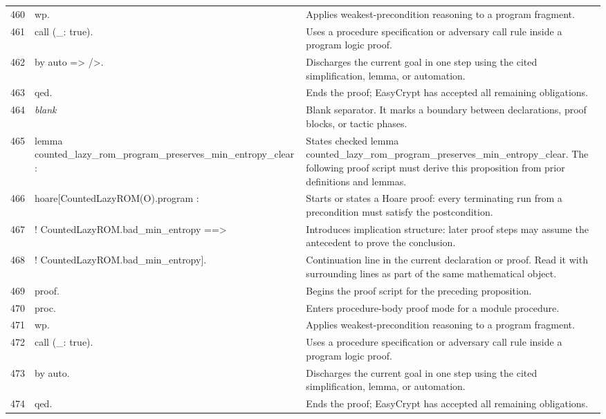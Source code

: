 \documentclass[10pt]{article}
\begin{document}
\begin{longtable}{r L{0.53\textwidth} L{0.37\textwidth}}
460 & {\ttfamily\scriptsize wp.} & Applies weakest-precondition reasoning to a program fragment. \\
461 & {\ttfamily\scriptsize call (\_: true).} & Uses a procedure specification or adversary call rule inside a program logic proof. \\
462 & {\ttfamily\scriptsize by auto => />.} & Discharges the current goal in one step using the cited simplification, lemma, or automation. \\
463 & {\ttfamily\scriptsize qed.} & Ends the proof; EasyCrypt has accepted all remaining obligations. \\
464 & {\ttfamily\scriptsize \emph{blank}} & Blank separator.  It marks a boundary between declarations, proof blocks, or tactic phases. \\
465 & {\ttfamily\scriptsize lemma counted\_lazy\_rom\_program\_preserves\_min\_entropy\_clear :} & States checked lemma counted\_lazy\_rom\_program\_preserves\_min\_entropy\_clear.  The following proof script must derive this proposition from prior definitions and lemmas. \\
466 & {\ttfamily\scriptsize   hoare[CountedLazyROM(O).program :} & Starts or states a Hoare proof: every terminating run from a precondition must satisfy the postcondition. \\
467 & {\ttfamily\scriptsize     ! CountedLazyROM.bad\_min\_entropy ==>} & Introduces implication structure: later proof steps may assume the antecedent to prove the conclusion. \\
468 & {\ttfamily\scriptsize     ! CountedLazyROM.bad\_min\_entropy].} & Continuation line in the current declaration or proof.  Read it with surrounding lines as part of the same mathematical object. \\
469 & {\ttfamily\scriptsize proof.} & Begins the proof script for the preceding proposition. \\
470 & {\ttfamily\scriptsize proc.} & Enters procedure-body proof mode for a module procedure. \\
471 & {\ttfamily\scriptsize wp.} & Applies weakest-precondition reasoning to a program fragment. \\
472 & {\ttfamily\scriptsize call (\_: true).} & Uses a procedure specification or adversary call rule inside a program logic proof. \\
473 & {\ttfamily\scriptsize by auto.} & Discharges the current goal in one step using the cited simplification, lemma, or automation. \\
474 & {\ttfamily\scriptsize qed.} & Ends the proof; EasyCrypt has accepted all remaining obligations. \\

\end{longtable}
\end{document}
